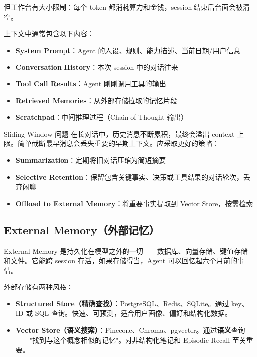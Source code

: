 \documentclass[a4paper]{article}
\begin{document}
但工作台有大小限制：每个 token 都消耗算力和金钱，session 结束后台面会被清空。

上下文中通常包含以下内容：
\begin{itemize}[leftmargin=2em]
    \item \textbf{System Prompt}：Agent 的人设、规则、能力描述、当前日期/用户信息
    \item \textbf{Conversation History}：本次 session 中的对话往来
    \item \textbf{Tool Call Results}：Agent 刚刚调用工具的输出
    \item \textbf{Retrieved Memories}：从外部存储拉取的记忆片段
    \item \textbf{Scratchpad}：中间推理过程（Chain-of-Thought 输出）
\end{itemize}

\begin{warningbox}{Sliding Window 问题}
在长对话中，历史消息不断累积，最终会溢出 context 上限。简单截断最早消息会丢失重要的早期上下文。应采取更好的策略：
\begin{itemize}[leftmargin=1.5em]
    \item \textbf{Summarization}：定期将旧对话压缩为简短摘要
    \item \textbf{Selective Retention}：保留包含关键事实、决策或工具结果的对话轮次，丢弃闲聊
    \item \textbf{Offload to External Memory}：将重要事实提取到 Vector Store，按需检索
\end{itemize}
\end{warningbox}

\subsection{External Memory（外部记忆）}

External Memory 是持久化在模型之外的一切——数据库、向量存储、键值存储和文件。它能跨 session 存活，如果存储得当，Agent 可以回忆起六个月前的事情。

外部存储有两种风格：

\begin{itemize}[leftmargin=2em]
    \item \textbf{Structured Store（精确查找）}：PostgreSQL、Redis、SQLite。通过 key、ID 或 SQL 查询。快速、可预测，适合用户画像、偏好和结构化数据。
    \item \textbf{Vector Store（语义搜索）}：Pinecone、Chroma、pgvector。通过\textbf{语义}查询——"找到与这个概念相似的记忆"。对非结构化笔记和 Episodic Recall 至关重要。
\end{itemize}
\end{document}
